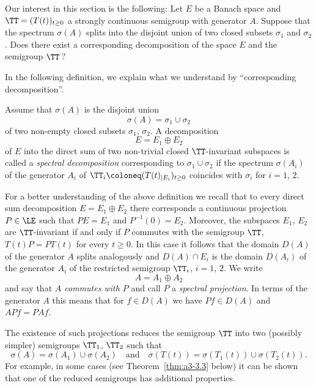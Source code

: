 Our interest in this section is the following: Let $E$ be a Banach space and $\TT = (T(t))_{t \geq 0}$ a strongly continuous semigroup with generator $A$.
Suppose that the spectrum $\sigma(A)$ splits into the disjoint union of two closed subsets $\sigma_{1}$ and $\sigma_{2}$.
Does there exist a corresponding decomposition of the space $E$ and the semigroup $\TT$\,?

In the following definition, we explain what we understand by \enquote{corresponding decomposition}.
\begin{definition}\label{def:a3-3.1}
Assume that $\sigma(A)$ is the disjoint union
\[
\sigma(A) = \sigma_{1} \cup \sigma_{2}
\]
of two non-empty closed subsets $\sigma_{1}$, $\sigma_{2}$.
A decomposition
\[
E = E_{1} \oplus E_{2}
\]
of\/ $E$ into the direct sum of two non-trivial closed $\TT$-invariant subspaces is called a \emph{spectral decomposition} corresponding to $\sigma_{1} \cup \sigma_{2}$ if the spectrum $\sigma(A_{i})$ of the generator $A_{i}$ of\/ $\TT_{i} \coloneq (T(t)_{|E_{i}})_{t \geq 0}$ coincides with $\sigma_{i}$ for $i = 1$, $2$.
\end{definition}
For a better understanding of the above definition we recall that to every direct sum decomposition $E = E_{1} \oplus E_{2}$ there corresponds a continuous projection $P \in \LE$ such that $PE = E_{1}$ and $P^{-1}(0) = E_{2}$.
Moreover, the subspaces $E_{1}$, $E_{2}$ are $\TT$-invariant if and only if\/ $P$ commutes with the semigroup $\TT$, \ie $T(t)P = PT(t)$ for every $t \geq 0$.
In this case it follows that the domain $D(A)$ of the generator $A$ splits analogously and $D(A) \cap E_{i}$ is the domain $D(A_{i})$ of the generator $A_{i}$ of the restricted semigroup $\TT_{i}$, $i = 1$, $2$.
We write
\[
A = A_{1} \oplus A_{2} 
\]
and say that \emph{$A$ commutes with $P$} and call $P$ a \emph{spectral projection}. 
In terms of the generator $A$ this means that for $f \in D(A)$ we have $Pf \in D(A)$ and $APf = PAf$.

The existence of such projections reduces the semigroup $\TT$ into two (possibly simpler) semigroups $\TT_{1}$, $\TT_{2}$ such that
\[
\sigma(A) = \sigma(A_{1}) \cup \sigma(A_{2}) \quad \text{and} \quad \sigma(T(t)) = \sigma(T_{1}(t)) \cup \sigma(T_{2}(t)) .
\]
For example, in some cases (see Theorem~\ref{thm:a3-3.3} below) it can be shown that one of the reduced semigroups has additional properties.

